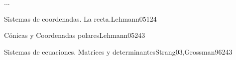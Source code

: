 \begin{syllabus}


\begin{justification}
...
\end{justification}

\begin{goals}
\item 
\item 
\end{goals}

\begin{outcomes}
    \item {}
    \item {}
\end{outcomes}

\begin{competences}
    \item {}
\end{competences}

\begin{unit}{Sistemas de coordenadas. La recta.}{Lehmann05}{12}{4}
   \begin{topics}
      \item 
      \item 
   \end{topics}
   \begin{learningoutcomes}
      \item 
   \end{learningoutcomes}
\end{unit}

\begin{unit}{Cónicas y Coordenadas polares}{Lehmann05}{24}{3}
   \begin{topics}
      \item 
      \item 
   \end{topics}

   \begin{learningoutcomes}
      \item 
      \item
      \item 
      \end{learningoutcomes}
\end{unit}

\begin{unit}{Sistemas de ecuaciones. Matrices y determinantes}{Strang03,Grossman96}{24}{3}
   \begin{topics}
      \item 
      \item 
      \item 
      \end{topics}


\end{unit}
\end{syllabus}
